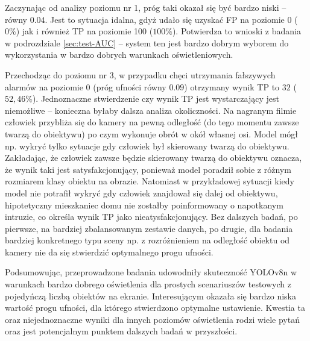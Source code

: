 Zaczynając od analizy poziomu nr 1, próg taki okazał się być bardzo niski -- równy $0.04$. Jest to sytuacja idalna, gdyż udało się uzyskać FP na poziomie 0 ($0\%$) jak i również TP na poziomie 100 ($100\%$). Potwierdza to wnioski z badania w podrozdziale \ref{sec:test-AUC} -- system ten jest bardzo dobrym wyborem do wykorzystania w bardzo dobrych warunkach oświetleniowych.

Przechodząc do poziomu nr 3, w przypadku chęci utrzymania fałszywych alarmów na poziomie $0$ (próg ufności równy $0.09$) otrzymany wynik TP to $32$ ($52,46\%$). Jednoznaczne stwierdzenie czy wynik TP jest wystarczający jest niemożliwe --  konieczna byłaby dalsza analiza okoliczności. Na nagranym filmie człowiek przybliża się do kamery na pewną odległość (do tego momentu zawsze twarzą do obiektywu) po czym wykonuje obrót w okół własnej osi.
Model mógł np. wykryć tylko sytuacje gdy człowiek był skierowany twarzą do obiektywu. Zakładając, że człowiek zawsze będzie skierowany twarzą do obiektywu oznacza, że wynik taki jest satysfakcjonujący, ponieważ model poradził sobie z różnym rozmiarem klasy obiektu na obrazie. Natomiast w przykładowej sytuacji kiedy model nie potrafił wykryć gdy człowiek znajdował się dalej od obiektywu, hipotetyczny mieszkaniec domu nie zostałby poinformowany o napotkanym intruzie, co określa wynik TP jako nieatysfakcjonujący. Bez dalszych badań, po pierwsze, na bardziej zbalansowanym zestawie danych, po drugie, dla badania bardziej konkretnego typu sceny np. z rozróżnieniem na odległość obiektu od kamery nie da się stwierdzić optymalnego progu ufności.

Podsumowując, przeprowadzone badania udowodniły skuteczność YOLOv8n w warunkach bardzo dobrego oświetlenia dla prostych scenariuszów testowych z pojedyńczą liczbą obiektów na ekranie. Interesującym okazała się bardzo niska wartość progu ufności, dla którego stwierdzono optymalne ustawienie. Kwestia ta oraz niejednoznaczne wyniki dla innych poziomów oświetlenia rodzi wiele pytań oraz jest potencjalnym punktem dalszych badań w przyszłości.






